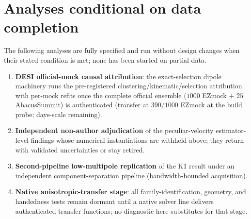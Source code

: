 \documentclass[11pt]{article}
\begin{document}
\section{Analyses conditional on data completion}
\label{sec:pending}
The following analyses are fully specified and run without design changes when
their stated condition is met; none has been started on partial data.
\begin{enumerate}[leftmargin=*]
\item \textbf{DESI official-mock causal attribution}: the exact-selection dipole
machinery runs the pre-registered clustering/kinematic/selection attribution with
per-mock refits once the complete official ensemble ($1000$ EZmock
$+$ $25$ AbacusSummit) is authenticated (transfer at
$390/1000$ EZmock at the build probe; days-scale
remaining).
\item \textbf{Independent non-author adjudication} of the peculiar-velocity
estimator-level findings whose numerical instantiations are withheld above; they
return with validated uncertainties or stay retired.
\item \textbf{Second-pipeline low-multipole replication} of the K1 result under an
independent component-separation pipeline (bandwidth-bounded acquisition).
\item \textbf{Native anisotropic-transfer stage}: all family-identification,
geometry, and handedness tests remain dormant until a native solver line delivers
authenticated transfer functions; no diagnostic here substitutes for that stage.
\end{enumerate}
\end{document}
